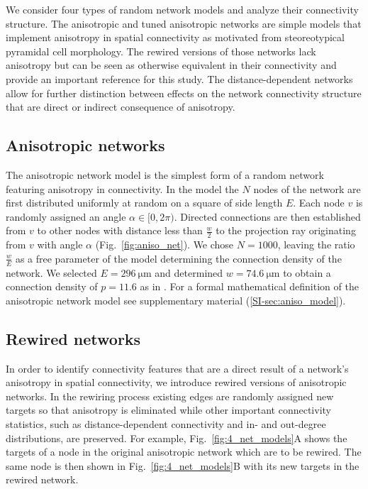 
We consider four types of random network models and analyze their
connectivity structure. The anisotropic and tuned anisotropic networks
are simple models that implement anisotropy in spatial connectivity as
motivated from steoreotypical pyramidal cell morphology. The rewired
versions of those networks lack anisotropy but can be seen as
otherwise equivalent in their connectivity and provide an important
reference for this study. The distance-dependent networks allow for
further distinction between effects on the network connectivity
structure that are direct or indirect consequence of anisotropy.

\subsection*{Anisotropic networks}

The anisotropic network model is the simplest form of a random network
featuring anisotropy in connectivity. In the model the $N$ nodes of
the network are first distributed uniformly at random on a square of
side length $E$. Each node $v$ is randomly assigned an angle
$\alpha \in [0,2\pi)$. Directed connections are then established from
$v$ to other nodes with distance less than $\frac{w}{2}$ to the
projection ray originating from $v$ with angle $\alpha$
(Fig.~\ref{fig:aniso_net}). We chose $N=1000$, leaving the ratio
$\frac{w}{E}$ as a free parameter of the model determining the
connection density of the network. We selected
$E=\SI{296}{\micro\meter}$ and determined $w=\SI{74.6}%
{\micro\meter}$ to obtain a connection density of $p=11.6$ as in
\cite{Song2005}. For a formal mathematical definition of the
anisotropic network model see supplementary material
(\ref{SI-sec:aniso_model}).






\bigskip

\subsection*{Rewired networks}
%
In order to identify connectivity features that are a direct result of
a network's anisotropy in spatial connectivity, we introduce rewired
versions of anisotropic networks. In the rewiring process existing
edges are randomly assigned new targets so that anisotropy is
eliminated while other important connectivity statistics, such as
distance-dependent connectivity and in- and out-degree distributions,
are preserved. For example, Fig.~\ref{fig:4_net_models}A shows the
targets of a node in the original anisotropic network which are to be
rewired. The same node is then shown in Fig.~\ref{fig:4_net_models}B
with its new targets in the rewired network.
%

